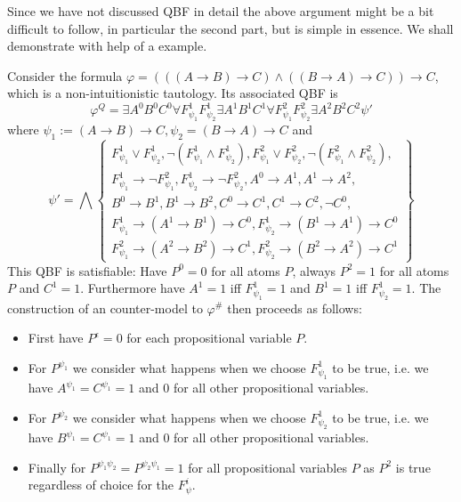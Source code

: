 \documentclass[a4paper,UKenglish,cleveref, autoref, thm-restate]{lipics-v2021}
\begin{document}
Since we have not discussed QBF in detail the above argument might be a bit difficult to follow, in particular the second part, but is simple in essence. We shall demonstrate with help of a example.

\begin{example}
	Consider the formula $\varphi = (((A\to B)\to C)\wedge((B\to A)\to C))\to C$, which is a non-intuitionistic tautology. Its associated QBF is $$\varphi^Q = \exists A^0B^0C^0\forall F_{\psi_1}^1F_{\psi_2}^1 \exists A^1B^1C^1\forall F_{\psi_1}^2F_{\psi_2}^2 \exists A^2B^2C^2\psi'$$where $\psi_1 := (A\to B)\to C, \psi_2 = (B\to A)\to C$ and $$\psi' = \bigwedge\left\{\begin{matrix}
		F^1_{\psi_1}\vee F^1_{\psi_2}, \neg(F^1_{\psi_1}\wedge F^1_{\psi_2}), F^2_{\psi_1}\vee F^2_{\psi_2},\neg(F^2_{\psi_1}\wedge F^2_{\psi_2}),\\F^1_{\psi_1}\to\neg F^2_{\psi_1},F^1_{\psi_2}\to\neg F^2_{\psi_2}, A^0\to A^1,A^1\to A^2,
		\\B^0\to B^1, B^1\to B^2, C^0\to C^1, C^1\to C^2,\neg C^0, \\
		F^1_{\psi_1}\to (A^1\to B^1)\to C^0, F^1_{\psi_2}\to(B^1\to A^1)\to C^0\\
		F^2_{\psi_1}\to (A^2\to B^2)\to C^1, F^2_{\psi_2}\to(B^2\to A^2)\to C^1
	\end{matrix}\right\}$$
	This QBF is satisfiable: Have $P^0 = 0$ for all atoms $P$, always $P^2 = 1$ for all atoms $P$ and $C^1 = 1$. Furthermore have $A^1 = 1$ iff $F^1_{\psi_1} = 1$ and $B^1 = 1$ iff $F^1_{\psi_2} = 1$. The construction of an counter-model to $\varphi^\#$ then proceeds as follows:
	\begin{itemize}
		\item First have $P^\epsilon = 0$ for each propositional variable $P$.
		\item For $P^{\psi_1}$ we consider what happens when we choose $F^1_{\psi_1}$ to be true, i.e. we have $A^{\psi_1} = C^{\psi_1} = 1$ and $0$ for all other propositional variables.
		\item For $P^{\psi_2}$ we consider what happens when we choose $F^1_{\psi_2}$ to be true, i.e. we have $B^{\psi_1} = C^{\psi_1} = 1$ and $0$ for all other propositional variables.
		\item Finally for $P^{\psi_1\psi_2} = P^{\psi_2\psi_1} = 1$ for all propositional variables $P$ as $P^2$ is true regardless of choice for the $F^i_\psi$.
	\end{itemize}
\end{example}	
\end{document}
